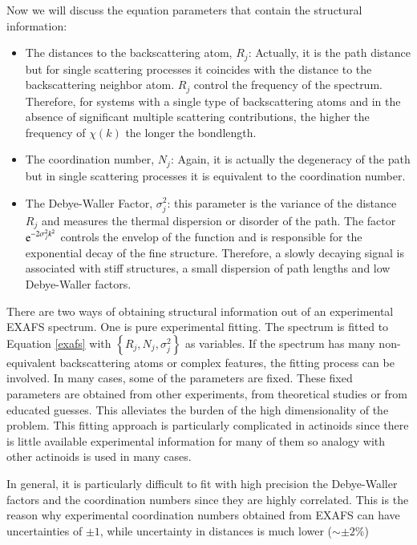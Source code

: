 Now we will discuss the equation parameters that contain the structural information:
\begin{itemize}
 \item The distances to the backscattering atom, $R_j$: Actually, it is the path distance but for 
single scattering processes it coincides with the distance to the backscattering neighbor atom. 
$R_j$ control the frequency of the spectrum. Therefore, for systems with a single 
type of backscattering atoms and in the absence of significant multiple scattering contributions, 
the higher the frequency of $\chi (k)$ the longer the bondlength.
 \item The coordination number, $N_j$: Again, it is actually the degeneracy of the path but in 
single scattering processes it is equivalent to the coordination number. 
 \item The Debye-Waller Factor, $\sigma_j^2$: this parameter is the variance of the distance $R_j$ 
and measures the thermal dispersion or disorder of the path. The factor 
$\mathrm{e}^{-2\sigma_j^2k^2}$ controls the envelop of the function and is responsible for the 
exponential 
decay of the fine structure. Therefore, a slowly decaying signal is associated with stiff 
structures, 
a small dispersion of path lengths and low Debye-Waller factors.
\end{itemize}

There are two ways of obtaining structural information out of an experimental EXAFS spectrum. One 
is pure experimental fitting. The spectrum is fitted to Equation \ref{exafs} with  
$\left\{R_j,N_j,\sigma_j^2\right\}$ as variables. If the spectrum has many non-equivalent 
backscattering atoms or complex features, the fitting process can be involved. In many cases, some 
of the parameters are fixed. These fixed parameters are obtained  from other experiments,
from theoretical studies or from educated guesses. This alleviates the burden of the 
high dimensionality of the problem. This fitting approach is particularly complicated in actinoids 
since there is little available experimental information for many of them so analogy with other 
actinoids is used in many cases\cite{coorchemrev_Denecke_2005}. 

In general, it is particularly difficult to fit 
with high precision the Debye-Waller factors and the coordination numbers since they are 
highly correlated. This is the reason why experimental coordination numbers obtained from EXAFS can 
have uncertainties of $\pm1$, while uncertainty in distances is much lower ($\sim\pm2\%$)

